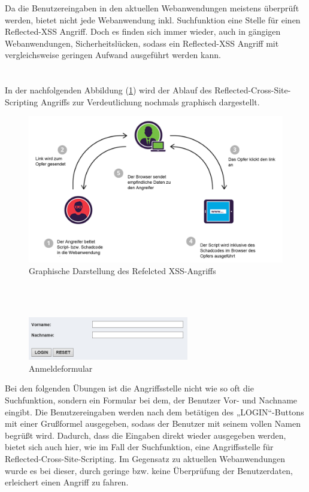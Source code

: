 Da die Benutzereingaben in den aktuellen Webanwendungen meistens überprüft werden, bietet nicht jede Webanwendung inkl. Suchfunktion eine Stelle für einen Reflected-XSS Angriff. 
Doch es finden sich immer wieder, auch in gängigen Webanwendungen, Sicherheitslücken, sodass ein Reflected-XSS Angriff mit vergleichsweise geringen Aufwand ausgeführt werden kann. \\
\ \\
\ \\
In der nachfolgenden Abbildung (\ref{fig:xss-reflected-grafik}) wird der Ablauf des Reflected-Cross-Site-Scripting Angriffs zur Verdeutlichung nochmals graphisch dargestellt.

\begin{figure}[H]
	\centering
	\includegraphics[width=\textwidth]{images/XSS/xss_reflected.png}
	\caption{Graphische Darstellung des Refelcted XSS-Angriffs}
	\label{fig:xss-reflected-grafik}
\end{figure}

\ \\
\ \\

\begin{figure}
  \includegraphics[width=7cm]{images/XSS/Anmeldeformular.jpg}
  \caption{Anmeldeformular}
\end{figure}
Bei den folgenden Übungen ist die Angriffsstelle nicht wie so oft die Suchfunktion, sondern ein Formular bei dem, der Benutzer Vor- und Nachname eingibt. 
Die Benutzereingaben werden nach dem betätigen des „LOGIN“-Buttons mit einer Grußformel ausgegeben, sodass der Benutzer mit seinem vollen Namen begrüßt wird. Dadurch, dass die Eingaben direkt wieder ausgegeben werden, bietet sich auch hier, wie im Fall der Suchfunktion, eine Angriffsstelle für Reflected-Cross-Site-Scripting. 
Im Gegensatz zu aktuellen Webanwendungen wurde es bei dieser, durch geringe bzw. keine Überprüfung der Benutzerdaten, erleichert einen Angriff zu fahren.
\newpage

